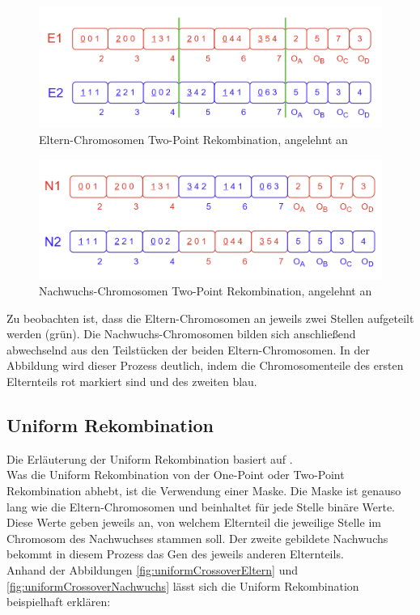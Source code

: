 \begin{figure}[H]
    \centering
    \includegraphics[scale = 0.5]{Bilder/BeispielTwoPointCrossover.png}
    \caption{Eltern-Chromosomen Two-Point Rekombination, angelehnt an \cite{torabi_using_2022}}
    \label{fig:twoPointCrossoverEltern}
\end{figure}
\begin{figure}[H]
    \centering
    \includegraphics[scale = 0.5]{Bilder/BeispielTwoPointCrossover2.png}
    \caption{Nachwuchs-Chromosomen Two-Point Rekombination, angelehnt an \cite{torabi_using_2022}}
    \label{fig:twoPointCrossoverNachwuchs}
\end{figure}

Zu beobachten ist, dass die Eltern-Chromosomen an jeweils zwei Stellen aufgeteilt werden (grün).
Die Nachwuchs-Chromosomen bilden sich anschließend abwechselnd aus den Teilstücken der beiden Eltern-Chromosomen.
In der Abbildung wird dieser Prozess deutlich, indem die Chromosomenteile des ersten Elternteils rot markiert sind und des zweiten blau.


\subsection{Uniform Rekombination}
\label{subsubsec:unformCrossover}
Die Erläuterung der Uniform Rekombination basiert auf \cite{syswerda_uniform_1989}.\\
Was die Uniform Rekombination von der One-Point oder Two-Point Rekombination abhebt, ist die Verwendung einer Maske. 
Die Maske ist genauso lang wie die Eltern-Chromosomen und beinhaltet für jede Stelle binäre Werte.
Diese Werte geben jeweils an, von welchem Elternteil die jeweilige Stelle im Chromosom des Nachwuchses stammen soll.
Der zweite gebildete Nachwuchs bekommt in diesem Prozess das Gen des jeweils anderen Elternteils.\\
Anhand der Abbildungen \ref{fig:uniformCrossoverEltern} und \ref{fig:uniformCrossoverNachwuchs} lässt sich die Uniform Rekombination beispielhaft erklären:

